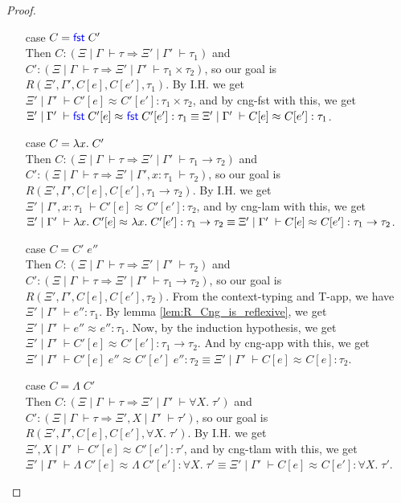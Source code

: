 \documentclass[twoside,11pt,openright]{report}
\theoremstyle{definition}
\newcommand{\Keyword}[1]{{\color{blue} \mathsf{#1}}}
\newcommand{\var}{x}
\newcommand{\expr}{e}
\newcommand{\Fst}{\Keyword{fst}\;}
\newcommand{\Tvar}{X}
\newcommand{\Tlam}{\Lambda\;}
\newcommand{\ctx}{C}
\newcommand{\Tprod}[2]{#1 \times #2}
\newcommand{\Tfunc}[2]{#1 \rightarrow #2}
\newcommand{\Tall}[2]{\forall #1.\; #2}
\newcommand{\typ}{\tau}
\newcommand{\venv}{\Gamma}
\newcommand{\tenv}{\Xi}
\newcommand{\jdg}[4]{#1 \; | \; #2 \; \vdash #3 : #4}
\newcommand{\jdgType}[3]{#1 \; | \; #2 \; \vdash #3}
\newcommand{\jdgRel}[6]{#1 \; | \; #2 \; \vdash #3 \approx^{#4} #5 : #6}
\begin{document}
\begin{proof}
\begin{itemize}
    \item[case] $\ctx = \Fst \ctx'$\\
      Then $\ctx : (\jdgType{\tenv}{\venv}{\typ} \Rightarrow \jdgType{\tenv'}{\venv'}{\typ_1})$ and $\ctx' : (\jdgType{\tenv}{\venv}{\typ} \Rightarrow \jdgType{\tenv'}{\venv'}{\Tprod{\typ_1}{\typ_2}})$, so our goal is $R(\tenv', \venv', \ctx[\expr], \ctx[\expr'], \typ_1)$. By I.H. we get $\jdgRel{\tenv'}{\venv'}{\ctx'[\expr]}{}{\ctx'[\expr']}{\Tprod{\typ_1}{\typ_2}}$, and by cng-fst with this, we get $\jdgRel{\tenv'}{\venv'}{\Fst \ctx'[\expr]}{}{\Fst \ctx'[\expr']}{\typ_1} \equiv \jdgRel{\tenv'}{\venv'}{\ctx[\expr]}{}{\ctx[\expr']}{\typ_1}$.
    \item[case] $\ctx = \fun \var . \ctx'$\\
      Then $\ctx : (\jdgType{\tenv}{\venv}{\typ} \Rightarrow \jdgType{\tenv'}{\venv'}{\Tfunc{\typ_1}{\typ_2}})$ and $\ctx' : (\jdgType{\tenv}{\venv}{\typ} \Rightarrow \jdgType{\tenv'}{\venv', x : \typ_1}{\typ_2})$, so our goal is $R(\tenv', \venv', \ctx[\expr], \ctx[\expr'], \Tfunc{\typ_1}{\typ_2})$. By I.H. we get $\jdgRel{\tenv'}{\venv', x : \typ_1}{\ctx'[\expr]}{}{\ctx'[\expr']}{\typ_2}$, and by cng-lam with this, we get $\jdgRel{\tenv'}{\venv'}{\fun \var . \ctx'[\expr]}{}{\fun \var . \ctx'[\expr']}{\Tfunc{\typ_1}{\typ_2}} \equiv \jdgRel{\tenv'}{\venv'}{\ctx[\expr]}{}{\ctx[\expr']}{\Tfunc{\typ_1}{\typ_2}}$.
    \item[case] $\ctx = \ctx' \; \expr''$\\
      Then $\ctx : (\jdgType{\tenv}{\venv}{\typ} \Rightarrow \jdgType{\tenv'}{\venv'}{\typ_2})$ and $\ctx' : (\jdgType{\tenv}{\venv}{\typ} \Rightarrow \jdgType{\tenv'}{\venv'}{\Tfunc{\typ_1}{\typ_2}})$, so our goal is $R(\tenv', \venv', \ctx[\expr], \ctx[\expr'], \typ_2)$. From the context-typing and T-app, we have $\jdg{\tenv'}{\venv'}{\expr''}{\typ_1}$. By lemma \ref{lem:R_Cng_is_reflexive}, we get $\jdgRel{\tenv'}{\venv'}{\expr''}{}{\expr''}{\typ_1}$. Now, by the induction hypothesis, we get $\jdgRel{\tenv'}{\venv'}{\ctx'[\expr]}{}{\ctx'[\expr']}{\Tfunc{\typ_1}{\typ_2}}$. And by cng-app with this, we get $\jdgRel{\tenv'}{\venv'}{\ctx'[\expr] \; \expr''}{}{\ctx'[\expr'] \; \expr''}{\typ_2} \equiv \jdgRel{\tenv'}{\venv'}{\ctx[\expr]}{}{\ctx[\expr]}{\typ_2}$.
    \item[case] $\ctx = \Tlam \ctx'$\\
      Then $\ctx : (\jdgType{\tenv}{\venv}{\typ} \Rightarrow \jdgType{\tenv'}{\venv'}{\Tall{\Tvar}{\typ'}})$ and $\ctx' : (\jdgType{\tenv}{\venv}{\typ} \Rightarrow \jdgType{\tenv', \Tvar}{\venv'}{\typ'})$, so our goal is $R(\tenv', \venv', \ctx[\expr], \ctx[\expr'], \Tall{\Tvar}{\typ'})$. By I.H. we get $\jdgRel{\tenv', \Tvar}{\venv'}{\ctx'[\expr]}{}{\ctx'[\expr']}{\typ'}$, and by cng-tlam with this, we get $\jdgRel{\tenv'}{\venv'}{\Tlam \ctx'[\expr]}{}{\Tlam \ctx'[\expr']}{\Tall{\Tvar}{\typ'}} \equiv \jdgRel{\tenv'}{\venv'}{\ctx[\expr]}{}{\ctx[\expr']}{\Tall{\Tvar}{\typ'}}$.
  \end{itemize}
\end{proof}
\end{document}
